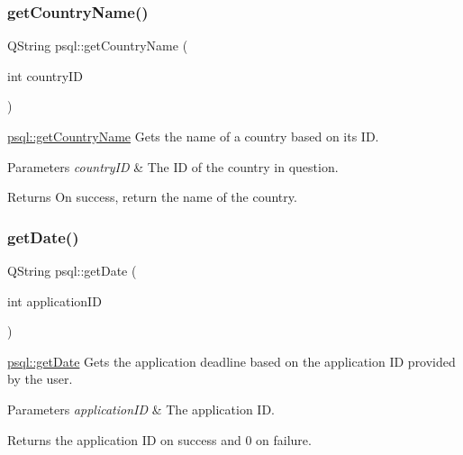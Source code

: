 \subsubsection{\texorpdfstring{get\+Country\+Name()}{getCountryName()}}
{\footnotesize\ttfamily Q\+String psql\+::get\+Country\+Name (\begin{DoxyParamCaption}\item[{int}]{country\+ID }\end{DoxyParamCaption})}



\hyperlink{classpsql_a5724e9992e6a5c98524ab73b98f4202d}{psql\+::get\+Country\+Name} Gets the name of a country based on its ID. 


\begin{DoxyParams}{Parameters}
{\em country\+ID} & The ID of the country in question. \\
\hline
\end{DoxyParams}
\begin{DoxyReturn}{Returns}
On success, return the name of the country. 
\end{DoxyReturn}
\mbox{\label{classpsql_a561f96bfe7e9d092077712dd6b186af8}} 
\subsubsection{\texorpdfstring{get\+Date()}{getDate()}}
{\footnotesize\ttfamily Q\+String psql\+::get\+Date (\begin{DoxyParamCaption}\item[{int}]{application\+ID }\end{DoxyParamCaption})}



\hyperlink{classpsql_a561f96bfe7e9d092077712dd6b186af8}{psql\+::get\+Date} Gets the application deadline based on the application ID provided by the user. 


\begin{DoxyParams}{Parameters}
{\em application\+ID} & The application ID. \\
\hline
\end{DoxyParams}
\begin{DoxyReturn}{Returns}
the application ID on success and 0 on failure. 
\end{DoxyReturn}
\mbox{\label{classpsql_a5f51e254b67ff932f287df2184ccc043}} 
